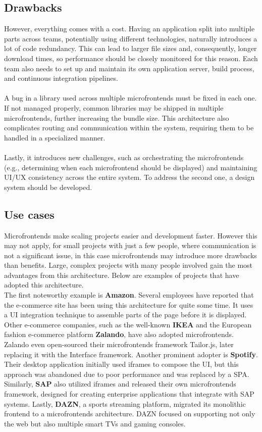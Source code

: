 \subsection{Drawbacks}
However, everything comes with a cost. Having an application split into multiple parts across teams, potentially using different technologies, naturally introduces a lot of code redundancy. This can lead to larger file sizes and, consequently, longer download times, so performance should be closely monitored for this reason. Each team also needs to set up and maintain its own application server, build process, and continuous integration pipelines. \\\\
\noindent
A bug in a library used across multiple microfrontends must be fixed in each one. If not managed properly, common libraries may be shipped in multiple microfrontends, further increasing the bundle size. This architecture also complicates routing and communication within the system, requiring them to be handled in a specialized manner. \\\\
\noindent
Lastly, it introduces new challenges, such as orchestrating the microfrontends (e.g., determining when each microfrontend should be displayed) and maintaining UI/UX consistency across the entire system. To address the second one, a design system should be developed.\cite{Geers}\cite{Pavlenko}

\subsection{Use cases}
Microfrontends make scaling projects easier and development faster. However this may not apply, for small projects with just a few people, where communication is not a significant issue, in this case microfrontends may introduce more drawbacks than benefits. Large, complex projects with many people involved gain the most advantages from this architecture. Below are examples of projects that have adopted this architecture.  \\

\noindent
The first noteworthy example is \textbf{Amazon}. Several employees have reported that the e-commerce site has been using this architecture for quite some time. It uses a UI integration technique to assemble parts of the page before it is displayed. Other e-commerce companies, such as the well-known \textbf{IKEA} and the European fashion e-commerce platform \textbf{Zalando}, have also adopted microfrontends. Zalando even open-sourced their microfrontends framework Tailor.js, later replacing it with the Interface framework. Another prominent adopter is \textbf{Spotify}. Their desktop application initially used iframes to compose the UI, but this approach was abandoned due to poor performance and was replaced by a SPA. Similarly, \textbf{SAP} also utilized iframes and released their own microfrontends framework, designed for creating enterprise applications that integrate with SAP systems. Lastly, \textbf{DAZN}, a sports streaming platform, migrated its monolithic frontend to a microfrontends architecture. DAZN focused on supporting not only the web but also multiple smart TVs and gaming consoles.\cite{Geers} \cite{MezzaliraBuildingMf}

